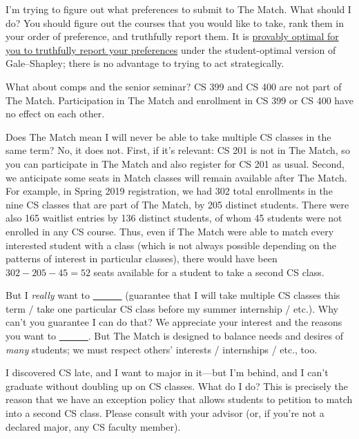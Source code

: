 \documentclass{article}
\begin{document}
\begin{description}[itemsep=0.9\baselineskip]
\qitem I'm trying to figure out what preferences to submit to The Match.  What should I do?
\aitem You should figure out the courses that you would like to take, rank them in your order of preference, and truthfully report them.  It is \href{https://www.tandfonline.com/doi/abs/10.1080/00029890.1981.11995301}{provably optimal for you to truthfully report your preferences} under the student-optimal version of Gale--Shapley; there is no advantage to trying to act strategically.

\qitem What about comps and the senior seminar?
\aitem CS 399 and CS 400 are not part of The Match.  Participation in The Match and enrollment in CS 399 or CS 400 have no effect on each other.

\qitem Does The Match mean I will never be able to take multiple CS classes in the same term?
\aitem No, it does not.  First, if it's relevant: CS 201 is not in The Match, so you can participate in The Match and also register for CS 201 as usual.  Second, we anticipate some seats in Match classes will remain available after The Match.  For example, in Spring 2019 registration, we had 302 total enrollments in the nine CS classes that are part of The Match, by 205 distinct students.  There were also 165 waitlist entries by 136 distinct students, of whom 45 students were not enrolled in any CS course.  Thus, even if The Match were able to match every interested student with a class (which is not always possible depending on the patterns of interest in particular classes), there would have been $302 - 205 - 45 = 52$ seats available for a student to take a second CS class.

\qitem But I \emph{really} want to \underline{~~~~~~} (guarantee that I will take multiple CS classes this term / take one particular CS class before my summer internship / etc.).  Why can't you guarantee I can do that?
\aitem We appreciate your interest and the reasons you want to \underline{~~~~~~}.  But The Match is designed to balance needs and desires of \emph{many} students; we must respect others' interests / internships / etc., too.

\qitem I discovered CS late, and I want to major in it---but I'm behind, and I can't graduate without doubling up on CS classes.  What do I do?
\aitem This is precisely the reason that we have an exception policy that allows students to petition to match into a second CS class.  Please consult with your advisor (or, if you're not a declared major, any CS faculty member).

\end{description}
\end{document}
